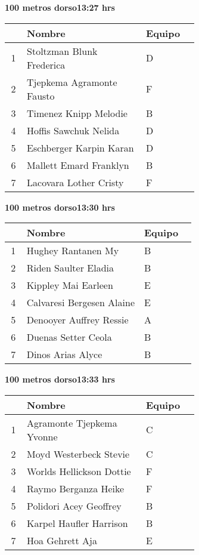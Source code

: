 \begin{minipage}{0.95\linewidth}
\begin{center}
\textbf{
100 metros dorso\hspace{1cm}13:27 hrs}
\end{center}
\begin{tabular}{cp{0.63\linewidth}l}
\hline
& \textbf{Nombre} & \textbf{Equipo} \\ \hline
1 & Stoltzman Blunk Frederica & D \\ 
2 & Tjepkema Agramonte Fausto & F \\ 
3 & Timenez Knipp Melodie & B \\ 
4 & Hoffis Sawchuk Nelida & D \\ 
5 & Eschberger Karpin Karan & D \\ 
6 & Mallett Emard Franklyn & B \\ 
7 & Lacovara Lother Cristy & F \\ 
\end{tabular}
\end{minipage}
\begin{minipage}{0.95\linewidth}
\begin{center}
\textbf{
100 metros dorso\hspace{1cm}13:30 hrs}
\end{center}
\begin{tabular}{cp{0.63\linewidth}l}
\hline
& \textbf{Nombre} & \textbf{Equipo} \\ \hline
1 & Hughey Rantanen My & B \\ 
2 & Riden Saulter Eladia & B \\ 
3 & Kippley Mai Earleen & E \\ 
4 & Calvaresi Bergesen Alaine & E \\ 
5 & Denooyer Auffrey Ressie & A \\ 
6 & Duenas Setter Ceola & B \\ 
7 & Dinos Arias Alyce & B \\ 
\end{tabular}
\end{minipage}
\begin{minipage}{0.95\linewidth}
\begin{center}
\textbf{
100 metros dorso\hspace{1cm}13:33 hrs}
\end{center}
\begin{tabular}{cp{0.63\linewidth}l}
\hline
& \textbf{Nombre} & \textbf{Equipo} \\ \hline
1 & Agramonte Tjepkema Yvonne & C \\ 
2 & Moyd Westerbeck Stevie & C \\ 
3 & Worlds Hellickson Dottie & F \\ 
4 & Raymo Berganza Heike & F \\ 
5 & Polidori Acey Geoffrey & B \\ 
6 & Karpel Haufler Harrison & B \\ 
7 & Hoa Gehrett Aja & E \\ 
\end{tabular}
\end{minipage}
